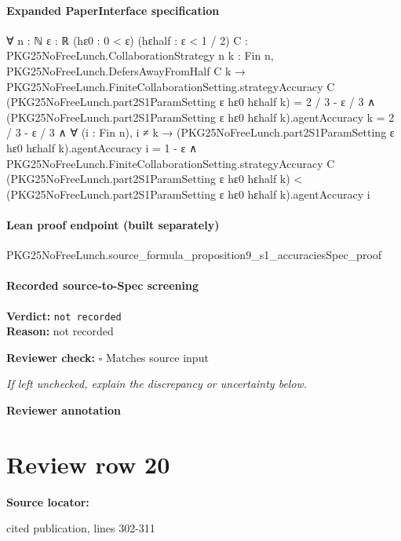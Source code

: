 \documentclass[10pt]{article}
\newcommand{\reviewerbox}{%
  \par\noindent\fbox{\parbox{0.96\linewidth}{\rule{0pt}{0.38in}}}\par
}
\newcommand{\reviewmatch}[1]{%
  \par\noindent\textbf{Reviewer check:} $\square$\; #1\par
  \noindent\emph{If left unchecked, explain the discrepancy or uncertainty below.}\par
}
\begin{document}
\paragraph{Expanded PaperInterface specification}
\begin{ReviewVerbatim}
∀ {n : ℕ} {ε : ℝ} (hε0 : 0 < ε) (hεhalf : ε < 1 / 2) {C : PKG25NoFreeLunch.CollaborationStrategy n} {k : Fin n},
  PKG25NoFreeLunch.DefersAwayFromHalf C k →
    PKG25NoFreeLunch.FiniteCollaborationSetting.strategyAccuracy C
          (PKG25NoFreeLunch.part2S1ParamSetting ε hε0 hεhalf k) =
        2 / 3 - ε / 3 ∧
      (PKG25NoFreeLunch.part2S1ParamSetting ε hε0 hεhalf k).agentAccuracy k = 2 / 3 - ε / 3 ∧
        ∀ (i : Fin n),
          i ≠ k →
            (PKG25NoFreeLunch.part2S1ParamSetting ε hε0 hεhalf k).agentAccuracy i = 1 - ε ∧
              PKG25NoFreeLunch.FiniteCollaborationSetting.strategyAccuracy C
                  (PKG25NoFreeLunch.part2S1ParamSetting ε hε0 hεhalf k) <
                (PKG25NoFreeLunch.part2S1ParamSetting ε hε0 hεhalf k).agentAccuracy i
\end{ReviewVerbatim}

\paragraph{Lean proof endpoint (built separately)}\begin{ReviewVerbatim}
PKG25NoFreeLunch.source_formula_proposition9_s1_accuraciesSpec_proof
\end{ReviewVerbatim}

\paragraph{Recorded source-to-Spec screening}
\textbf{Verdict:} \texttt{not recorded}
\\
\textbf{Reason:} not recorded
\reviewmatch{Matches source input}
\noindent\textbf{Reviewer annotation}\par
\reviewerbox
\clearpage
\hypertarget{source-claim-6680595ed06f984e}{}
\section*{Review row 20}
\textbf{Source locator:} {\footnotesize\raggedright cited publication, lines 302-\allowbreak{}311\par}
\end{document}
